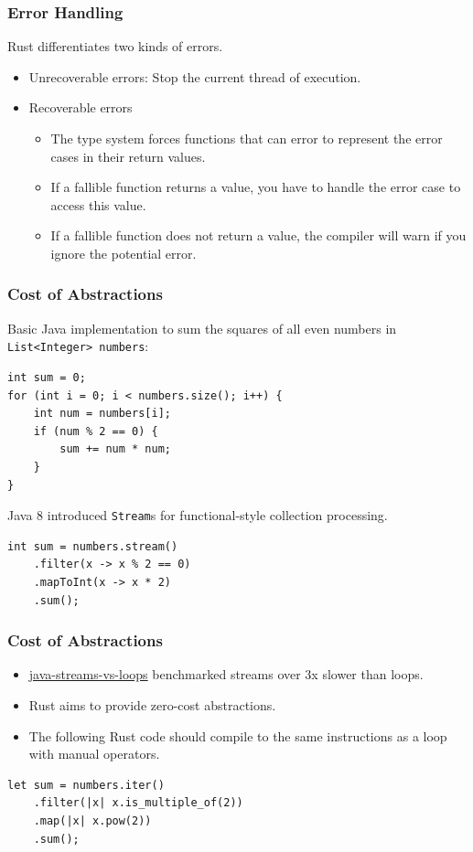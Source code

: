 \begin{frame}[fragile]
    \frametitle{Error Handling}
    Rust differentiates two kinds of errors.
    \pause
    \vfill
    \begin{itemize}
        \item Unrecoverable errors: Stop the current thread of execution.
        \pause
        \item Recoverable errors
        \begin{itemize}
            \item The type system forces functions that can error to represent the error cases in their return values.
            \pause
            \item If a fallible function returns a value, you have to handle the error case to access this value.
            \item If a fallible function does not return a value, the compiler will warn if you ignore the potential error.
        \end{itemize}
    \end{itemize}
\end{frame}

\begin{frame}[fragile]
    \frametitle{Cost of Abstractions}
Basic Java implementation to sum the squares of all even numbers in \texttt{List<Integer> numbers}:
    \begin{verbatim}
int sum = 0;
for (int i = 0; i < numbers.size(); i++) {
    int num = numbers[i];
    if (num % 2 == 0) {
        sum += num * num;
    }
}
    \end{verbatim}
    \pause
    \vfill
Java 8 introduced \texttt{Stream}s for functional-style collection processing.
    \begin{verbatim}
int sum = numbers.stream()
    .filter(x -> x % 2 == 0)
    .mapToInt(x -> x * 2)
    .sum();
    \end{verbatim}
\end{frame}

\begin{frame}[fragile]
    \frametitle{Cost of Abstractions}
    \begin{itemize}
        \item \href{https://www.baeldung.com/java-streams-vs-loops}{java-streams-vs-loops} benchmarked streams over 3x slower than loops.
        \pause
        \vspace{.3cm}
        \item Rust aims to provide zero-cost abstractions.
        \item The following Rust code should compile to the same instructions as a loop with manual operators.
    \end{itemize}
    \pause
    \vfill
    \begin{verbatim}
let sum = numbers.iter()
    .filter(|x| x.is_multiple_of(2))
    .map(|x| x.pow(2))
    .sum();
    \end{verbatim}
\end{frame}

